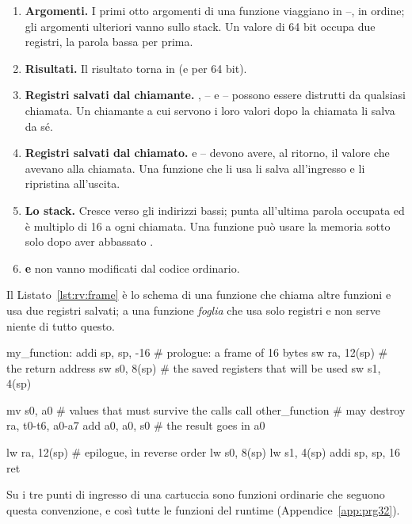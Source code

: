 \begin{enumerate}
\item \textbf{Argomenti.} I primi otto argomenti di una funzione viaggiano in
  --, in ordine; gli argomenti ulteriori vanno sullo stack. Un
  valore di 64 bit occupa due registri, la parola bassa per prima.
\item \textbf{Risultati.} Il risultato torna in  (e  per 64
  bit).
\item \textbf{Registri salvati dal chiamante.} , -- e
  -- possono essere distrutti da qualsiasi chiamata. Un
  chiamante a cui servono i loro valori dopo la chiamata li salva da sé.
\item \textbf{Registri salvati dal chiamato.}  e --
  devono avere, al ritorno, il valore che avevano alla chiamata. Una funzione
  che li usa li salva all'ingresso e li ripristina all'uscita.
\item \textbf{Lo stack.} Cresce verso gli indirizzi bassi;  punta
  all'ultima parola occupata ed è multiplo di 16 a ogni chiamata. Una funzione
  può usare la memoria sotto  solo dopo aver abbassato .
\item \textbf{ e } non vanno modificati dal codice ordinario.
\end{enumerate}

Il Listato~\ref{lst:rv:frame} è lo schema di una funzione che chiama altre
funzioni e usa due registri salvati; a una funzione \emph{foglia} che usa solo
registri  e  non serve niente di tutto questo.

\begin{asm}[caption={Il frame di una funzione non foglia.},label=lst:rv:frame]
my_function:
    addi sp, sp, -16        # prologue: a frame of 16 bytes
    sw   ra, 12(sp)         # the return address
    sw   s0, 8(sp)          # the saved registers that will be used
    sw   s1, 4(sp)

    mv   s0, a0             # values that must survive the calls
    call other_function     # may destroy ra, t0-t6, a0-a7
    add  a0, a0, s0         # the result goes in a0

    lw   ra, 12(sp)         # epilogue, in reverse order
    lw   s0, 8(sp)
    lw   s1, 4(sp)
    addi sp, sp, 16
    ret
\end{asm}

Su \prg i tre punti di ingresso di una cartuccia sono funzioni ordinarie che
seguono questa convenzione, e così tutte le funzioni del runtime
(Appendice~\ref{app:prg32}).


